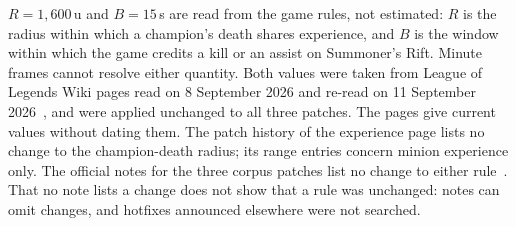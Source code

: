 $R = 1{,}600$\,u and $B = 15$\,s are read from the game rules, not estimated: $R$ is the radius
within which a champion's death shares experience, and $B$ is the window within which the game
credits a kill or an assist on Summoner's Rift. Minute frames cannot resolve either quantity.
Both values were taken from League of Legends Wiki pages read on 8 September 2026 and re-read on
11 September 2026~\cite{lolwiki2026experience,lolwiki2026assist,lolwiki2026kill}, and were applied
unchanged to all three patches.
The pages give current values without dating them. The patch history of the experience page lists
no change to the champion-death radius; its range entries concern minion experience only. The
official notes for the three corpus patches list no change to either
rule~\cite{riot2025patch2514,riot2025patch2515,riot2025patch2516}. That no note lists a change does
not show that a rule was
unchanged: notes can omit changes, and hotfixes announced elsewhere were not searched.
